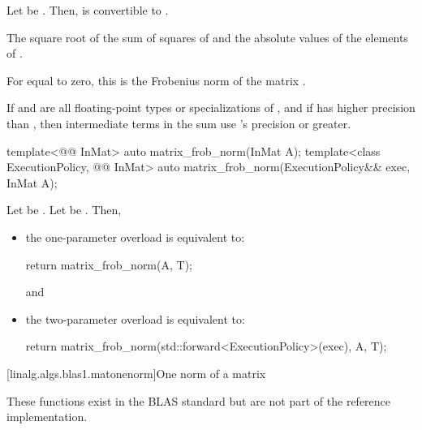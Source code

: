 \begin{itemdescr}

\pnum
\mandates
Let  be
.
Then, 
is convertible to .

\pnum
\returns
The square root of the sum of squares
of  and the absolute values of the elements of .
\begin{note}
For  equal to zero,
this is the Frobenius norm of the matrix .
\end{note}

\pnum
\remarks
If  and 
are all floating-point types or specializations of ,
and if  has higher precision
than ,
then intermediate terms in the sum use 's precision or greater.
\end{itemdescr}

\begin{itemdecl}
template<@@ InMat>
  auto matrix_frob_norm(InMat A);
template<class ExecutionPolicy, @@ InMat>
  auto matrix_frob_norm(ExecutionPolicy&& exec, InMat A);
\end{itemdecl}

\begin{itemdescr}
\pnum
\effects
Let  be
.
Let  be
.
Then,
\begin{itemize}
\item
the one-parameter overload is equivalent to:
\begin{codeblock}
return matrix_frob_norm(A, T{});
\end{codeblock}
and
\item
the two-parameter overload is equivalent to:
\begin{codeblock}
return matrix_frob_norm(std::forward<ExecutionPolicy>(exec), A, T{});
\end{codeblock}
\end{itemize}
\end{itemdescr}

[linalg.algs.blas1.matonenorm]{One norm of a matrix}

\pnum
\begin{note}
These functions exist in the BLAS standard\supercite{blas-std}
but are not part of the reference implementation.
\end{note}

